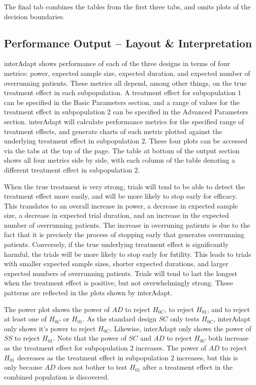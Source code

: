 \documentclass{article}
\newcommand{\interAdapt}{\textsf{interAdapt }}
\begin{document}
The final tab combines the tables from the first three tabs, and omits plots of the decision boundaries.


\subsection*{Performance Output -- Layout \& Interpretation}

\interAdapt shows performance of each of the three designs in terms of four metrics: power, expected sample size, expected duration, and expected number of overrunning patients. These metrics all depend, among other things, on the true treatment effect in each subpopulation. A treatment effect for subpopulation $1$ can be specified in the Basic Parameters section, and a range of values for the treatment effect in subpopulation $2$ can be specified in the Advanced Parameters section. %
 \interAdapt will calculate performance metrics for the specified range of treatment effects, and generate charts of each metric plotted against the underlying treatment effect in subpopulation $2$. These four plots can be accessed via the tabs at the top of the page. The table at bottom of the output section shows all four metrics side by side, with each column of the table denoting a different treatment effect in subpopulation $2$.%

When the true treatment is very strong, trials will tend to be able to detect the treatment effect more easily, and will be more likely to stop early for efficacy. This translates to an overall increase in power, a decrease in expected sample size, a decrease in expected trial duration, and an increase in the expected number of overrunning patients. The increase in overruning patients is due to the fact that it is precisely the process of stopping early that generates overrunning patients. Conversely, if the true underlying treatment effect is significantly harmful, the trials will be more likely to stop early for futility. This leads to trials with smaller expected sample sizes, shorter expected durations, and larger expected numbers of overrunning patients. Trials will tend to last the longest when the treatment effect is positive, but not overwhelmingly strong. These patterns are reflected in the plots shown by \textsf{interAdapt}.

The power plot shows the power of $AD$ to reject $H_{0C}$, to reject $H_{01}$, and to reject at least one of $H_{0C}$ or $H_{01}$. As the standard design $SC$ only tests $H_{0C}$, \interAdapt only shows it’s power to reject $H_{0C}$. Likewise, \interAdapt only shows the power of $SS$ to reject $H_{01}$. Note that the power of $SC$ and $AD$ to reject $H_{0C}$ both increase as the treatment effect for subpopulation $2$ increases. The power of $AD$ to reject $H_{01}$ decreases as the treatment effect in subpopulation $2$ increases, but this is only because $AD$ does not bother to test $H_{01}$ after a treatment effect in the combined population is discovered.
\end{document}
